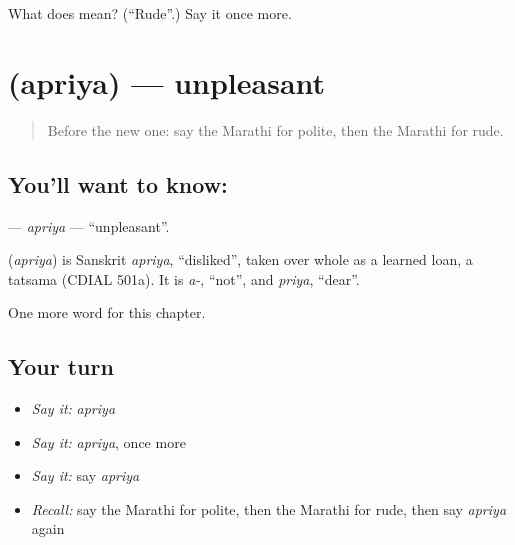 \begin{tcolorbox}[breakable,colback=teal!4,colframe=teal!35!black,title={Before you move on}]
What does  mean? (\textquotedblleft{}Rude\textquotedblright{}.) Say it once more.
\end{tcolorbox}
\section[\texorpdfstring{\mr{अप्रिय} (apriya)}{अप्रिय (apriya)}]{ (apriya) — unpleasant}

\label{lesson:MR-C174-apriya}



\begin{quote}
Before the new one: say the Marathi for polite, then the Marathi for rude.
\end{quote}

\subsection*{You'll want to know: }
\textbf{} — \emph{apriya} — \textquotedblleft{}unpleasant\textquotedblright{}.

\begin{cousinweb}
\textbf{} (\emph{apriya}) is Sanskrit \emph{apriya}, \textquotedblleft{}disliked\textquotedblright{}, taken over whole as a learned loan, a tatsama (CDIAL 501a). It is \emph{a-}, \textquotedblleft{}not\textquotedblright{}, and \emph{priya}, \textquotedblleft{}dear\textquotedblright{}.
\end{cousinweb}

\begin{grammarlens}[title={What you've built}]
One more word for this chapter.
\end{grammarlens}

\subsection*{Your turn}
\begin{itemize}
\raggedright
  \item \emph{Say it:} \emph{apriya}
  \item \emph{Say it:} \emph{apriya}, once more
  \item \emph{Say it:} say \emph{apriya}
  \item \emph{Recall:} say the Marathi for polite, then the Marathi for rude, then say \emph{apriya} again
\end{itemize}

